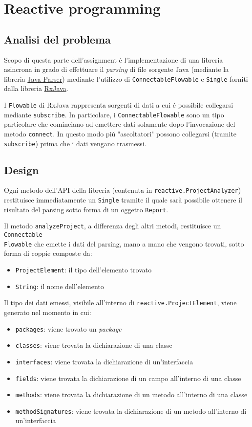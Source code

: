 \documentclass[report]{subfiles}
\begin{document}
	\section{Reactive programming}
	\subsection{Analisi del problema}
	Scopo di questa parte dell'assignment \'e l'implementazione di una libreria asincrona in grado di effettuare il \emph{parsing} di file sorgente Java (mediante la libreria \href{https://javaparser.org/}{Java Parser}) mediante l'utilizzo di \texttt{ConnectableFlowable} e \texttt{Single} forniti dalla libreria \href{https://reactivex.io/intro.html}{RxJava}.
	
	I \texttt{Flowable} di RxJava rappresenta sorgenti di dati a cui \'e possibile collegarsi mediante \texttt{subscribe}. In particolare, i \texttt{ConnectableFlowable} sono un tipo particolare che cominciano ad emettere dati solamente dopo l'invocazione del metodo \texttt{connect}. In questo modo pi\'u "ascoltatori" possono collegarsi (tramite \texttt{subscribe}) prima che i dati vengano trasmessi.
	
	\subsection{Design}
	Ogni metodo dell'API della libreria (contenuta in \texttt{reactive.ProjectAnalyzer}) restituisce immediatamente un \texttt{Single} tramite il quale sarà possibile ottenere il risultato del parsing sotto forma di un oggetto \texttt{Report}.
	
	Il metodo \texttt{analyzeProject}, a differenza degli altri metodi, restituisce un \texttt{Connectable\\Flowable} che emette i dati del parsing, mano a mano che vengono trovati, sotto forma di coppie composte da:
	\begin{itemize}
		\item \texttt{ProjectElement}: il tipo dell'elemento trovato
		\item \texttt{String}: il nome dell'elemento
	\end{itemize}
	
	Il tipo dei dati emessi, visibile all'interno di \texttt{reactive.ProjectElement}, viene generato nel momento in cui:
	\begin{itemize}
		\item \texttt{packages}: viene trovato un \emph{package}
		\item \texttt{classes}: viene trovata la dichiarazione di una classe
		\item \texttt{interfaces}: viene trovata la dichiarazione di un'interfaccia
		\item \texttt{fields}: viene trovata la dichiarazione di un campo all'interno di una classe
		\item \texttt{methods}: viene trovata la dichiarazione di un metodo all'interno di una classe
		\item \texttt{methodSignatures}: viene trovata la dichiarazione di un metodo all'interno di un'interfaccia
	\end{itemize}
	
\end{document}

